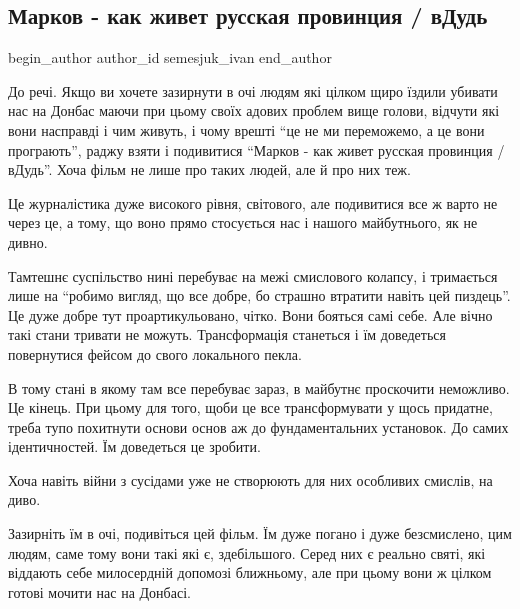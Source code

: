  
 
 
 
 
 
\subsection{Марков - как живет русская провинция / вДудь}
\label{sec:26_11_2020.fb.semesjuk_ivan.2.markov_film}
\ifcmt
	begin_author
   author_id semesjuk_ivan
	end_author
\fi

До речі. Якщо ви хочете зазирнути в очі людям які цілком щиро їздили убивати
нас на Донбас маючи при цьому своїх адових проблем вище голови, відчути які
вони насправді і чим живуть, і чому врешті \enquote{це не ми переможемо, а це вони
програють}, раджу взяти і подивитися \enquote{Марков - как живет русская провинция /
вДудь}. Хоча фільм не лише про таких людей, але й про них теж.

Це журналістика дуже високого рівня, світового, але подивитися все ж варто не
через це, а тому, що воно прямо стосується нас і нашого майбутнього, як не
дивно. 

Тамтешнє суспільство нині перебуває на межі смислового колапсу, і тримається
лише на \enquote{робимо вигляд, що все добре, бо страшно втратити навіть цей пиздець}.
Це дуже добре тут проартикульовано, чітко. Вони бояться самі себе. Але вічно
такі стани тривати не можуть. Трансформація станеться і їм доведеться
повернутися фейсом до свого локального пекла. 

В тому стані в якому там все перебуває зараз, в майбутнє проскочити неможливо.
Це кінець. При цьому для того, щоби це все трансформувати у щось придатне,
треба тупо похитнути основи основ аж до фундаментальних установок. До самих
ідентичностей. Їм доведеться це зробити.

Хоча навіть війни з сусідами уже не створюють для них особливих смислів, на диво. 

Зазирніть їм в очі, подивіться цей фільм. Їм дуже погано і дуже безсмислено,
цим людям, саме тому вони такі які є, здебільшого. Серед них є реально святі,
які віддають себе милосердній допомозі ближньому, але при цьому вони ж цілком
готові мочити нас на Донбасі. 

